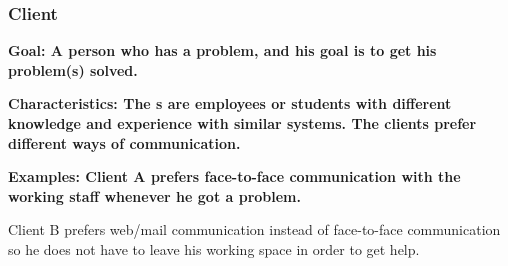 \subsubsection{Client}

\bf{Goal:} A person who has a problem, and his goal is to get his problem(s) solved.

\bf{Characteristics:} The \client{}s are employees or students with different knowledge and experience with similar systems. The clients prefer different ways of communication.%

\bf{Examples:} Client A prefers face-to-face communication with the working staff whenever he got a problem. 

Client B prefers web/mail communication instead of face-to-face communication so he does not have to leave his working space in order to get help. 
